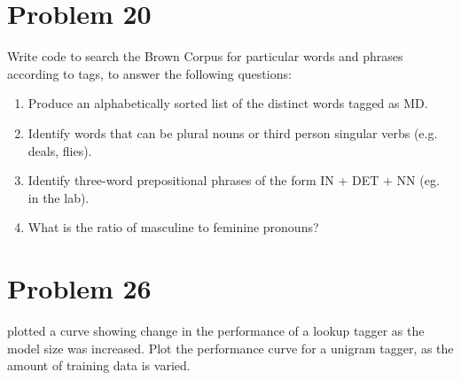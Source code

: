 \documentclass[12pt]{article}
\begin{document}
	\section*{Problem 20}
	Write code to search the Brown Corpus for particular words and phrases according to tags, to answer the following questions:
	\begin{enumerate}
		\item Produce an alphabetically sorted list of the distinct words tagged as MD.
		\item Identify words that can be plural nouns or third person singular verbs (e.g. deals, flies).
		\item Identify three-word prepositional phrases of the form IN + DET + NN (eg. in the lab).
		\item What is the ratio of masculine to feminine pronouns?
	\end{enumerate}
	
	
	\section*{Problem 26}
	  plotted a curve showing change in the performance of a lookup tagger as the model size was increased. Plot the performance curve for a unigram tagger, as the amount of training data is varied.
	
\end{document}

